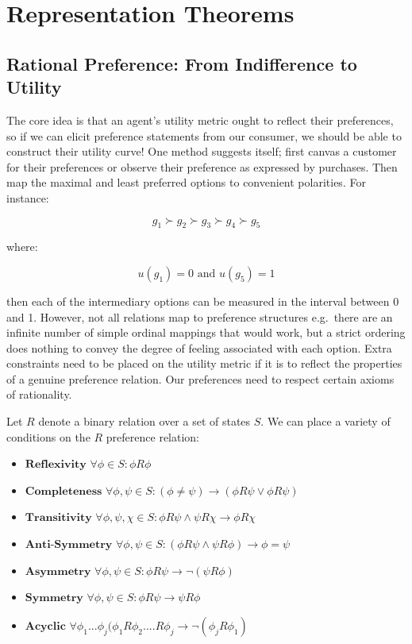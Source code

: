 \documentclass[
]{book}
\theoremstyle{definition}
\theoremstyle{definition}
\theoremstyle{definition}
\theoremstyle{remark}
\begin{document}
\hypertarget{representation-theorems}{%
\section{Representation Theorems}\label{representation-theorems}}

\hypertarget{rational-preference-from-indifference-to-utility}{%
\subsection{Rational Preference: From Indifference to Utility}\label{rational-preference-from-indifference-to-utility}}

The core idea is that an agent's utility metric ought to reflect their preferences, so if we can elicit preference statements from our consumer, we should be able to construct their utility curve! One method suggests itself; first canvas a customer for their preferences or observe their preference as expressed by purchases. Then map the maximal and least preferred options to convenient polarities. For instance:

\[ g_{1} \succ g_{2} \succ g_{3} \succ g_{4} \succ g_{5} \]

where:

\[ u(g_{1}) = 0 \text{ and } u(g_{5}) = 1 \]

then each of the intermediary options can be measured in the interval between 0 and 1. However, not all relations map to preference structures e.g.~there are an infinite number of simple ordinal mappings that would work, but a strict ordering does nothing to convey the degree of feeling associated with each option. Extra constraints need to be placed on the utility metric if it is to reflect the properties of a genuine preference relation. Our preferences need to respect certain axioms of rationality.

Let \(R\) denote a binary relation over a set of states \(S\).
We can place a variety of conditions on the \(R\) preference relation:

\begin{itemize}
\item
  \(\textbf{Reflexivity}\) \(\forall \phi \in S: \phi R \phi\)
\item
  \(\textbf{Completeness}\) \(\forall \phi, \psi \in S: (\phi \neq \psi) \rightarrow (\phi R \psi \vee \phi R \psi)\)
\item
  \(\textbf{Transitivity}\) \(\forall \phi, \psi, \chi \in S: \phi R \psi \wedge \psi R \chi \rightarrow \phi R \chi\)
\item
  \(\textbf{Anti-Symmetry}\) \(\forall \phi, \psi \in S: (\phi R \psi \wedge \psi R \phi) \rightarrow \phi = \psi\)
\item
  \(\textbf{Asymmetry}\) \(\forall \phi, \psi \in S: \phi R \psi \rightarrow \neg(\psi R \phi)\)
\item
  \(\textbf{Symmetry}\) \(\forall \phi, \psi \in S: \phi R \psi \rightarrow \psi R \phi\)
\item
  \(\textbf{Acyclic}\) \(\forall \phi_{1} ... \phi_{j} ( \phi_{1} R \phi_{2} .... R \phi_{j} \rightarrow \neg(\phi_{j} R \phi_{1})\)
\end{itemize}
\end{document}
